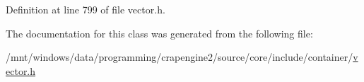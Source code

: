Definition at line 799 of file vector.\+h.



The documentation for this class was generated from the following file\+:\begin{DoxyCompactItemize}
\item 
/mnt/windows/data/programming/crapengine2/source/core/include/container/\hyperlink{vector_8h}{vector.\+h}\end{DoxyCompactItemize}
